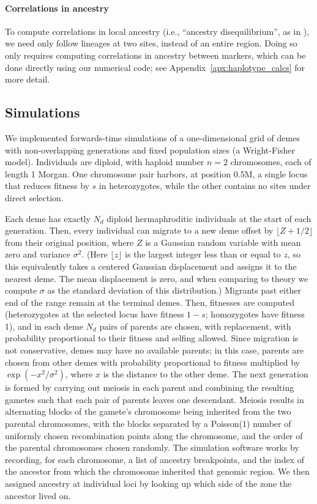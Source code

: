 \documentclass[11pt,letterpaper]{article}
\begin{document}
\paragraph{Correlations in ancestry}
To compute correlations in local ancestry
(i.e., ``ancestry disequilibrium'', as in \citet{pool2015mosaic,Schumer2016}),
we need only follow lineages at two sites, instead of an entire region. 
Doing so only requires computing correlations in ancestry between markers,
which can be done directly using our numerical code;
see Appendix~\ref{apx:haplotype_calcs} for more detail.


\subsection*{Simulations}

We implemented forwards-time simulations of a one-dimensional grid of demes
with non-overlapping generations and fixed population sizes (a Wright-Fisher model). Individuals are diploid, with haploid number $n=2$ chromosomes, each of length 1 Morgan. One chromosome pair harbors, at position 0.5M, a single locus that reduces fitness by $s$ in heterozygotes, while the other contains no sites under direct selection.

Each deme has exactly $N_d$ diploid hermaphroditic individuals at the start of each generation.
Then, every individual can migrate to a new deme offset by $\lfloor Z + 1/2 \rfloor$ from their original position,
where $Z$ is a Gaussian random variable with mean zero and variance $\sigma^2$.
(Here $\lfloor z \rfloor$ is the largest integer less than or equal to $z$,
so this equivalently takes a centered Gaussian displacement and assigns it to the nearest deme. 
The mean displacement is zero, and when comparing to theory we compute $\sigma$ as the standard deviation of this distribution.)
Migrants past either end of the range remain at the terminal demes.
Then, 
fitnesses are computed (heterozygotes at the selected locus have fitness $1-s$; homozygotes have fitness 1),
and in each deme $N_d$ pairs of parents are chosen, with replacement,
with probability proportional to their fitness and selfing allowed.
Since migration is not conservative, demes may have no available parents;
in this case, parents are chosen from other demes with probability proportional to fitness
multiplied by $\exp(-x^2/\sigma^2)$, where $x$ is the distance to the other deme. 
The next generation is formed by carrying out meiosis in each parent
and combining the resulting gametes such that each pair of parents leaves one descendant.
Meiosis results in alternating blocks of the gamete's chromosome
being inherited from the two parental chromosomes,
with the blocks separated by a Poisson(1) number of uniformly chosen recombination points along the chromosome,
and the order of the parental chromosomes chosen randomly.
The simulation software works by recording, for each chromosome, 
a list of ancestry breakpoints, and the index of the ancestor from which 
the chromosome inherited that genomic region.
We then assigned ancestry at individual loci by looking up which side of the zone the ancestor lived on.
\end{document}
